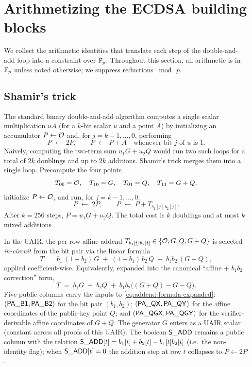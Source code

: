 \section{Arithmetizing the ECDSA building blocks}\label{sec:arith}

We collect the arithmetic identities that translate each step of the
double-and-add loop into a constraint over $\mathbb{F}_p$. Throughout this
section, all arithmetic is in $\mathbb{F}_p$ unless noted otherwise; we
suppress reductions $\bmod\,p$.

\subsection{Shamir's trick}\label{sec:shamir}

The standard binary double-and-add algorithm computes a single
scalar multiplication $u A$ (for a $k$-bit scalar $u$ and a point $A$)
by initializing an accumulator $P \leftarrow \mathcal{O}$ and, for
$j = k-1, \dots, 0$, performing
$$
P \;\leftarrow\; 2P, \qquad
P \;\leftarrow\; P + A \quad \text{whenever bit $j$ of $u$ is $1$.}
$$
Naively, computing the two-term sum $u_1 G + u_2 Q$ would run two
such loops for a total of $2k$ doublings and up to $2k$ additions.
Shamir's trick merges them into a single loop. Precompute the four
points
$$
T_{00} = \mathcal{O},\quad T_{10} = G,\quad T_{01} = Q,\quad T_{11} = G + Q,
$$
initialize $P \leftarrow \mathcal{O}$, and run, for $j = k-1, \dots, 0$,
$$
P \;\leftarrow\; 2P, \qquad
P \;\leftarrow\; P + T_{b_1[j]\,b_2[j]}.
$$
After $k = 256$ steps, $P = u_1 G + u_2 Q$. The total cost is $k$
doublings and at most $k$ mixed additions.

In the UAIR, the per-row affine addend
$T_{b_1[t]\,b_2[t]} \in \{\mathcal{O}, G, Q, G+Q\}$ is selected
\emph{in-circuit} from the bit pair via the linear formula
\begin{equation}\label{eq:addend-formula}
  T \;=\; b_1\,(1 - b_2)\,G \;+\; (1 - b_1)\,b_2\,Q \;+\; b_1 b_2\,(G + Q),
\end{equation}
applied coefficient-wise. Equivalently, expanded into the canonical
``affine + $b_1 b_2$ correction'' form,
\begin{equation}\label{eq:addend-formula-expanded}
  T \;=\; b_1 G \;+\; b_2 Q \;+\; b_1 b_2 \bigl((G+Q) - G - Q\bigr).
\end{equation}
Five public columns carry the inputs to \eqref{eq:addend-formula-expanded}:
$(\mathsf{PA\_B1}, \mathsf{PA\_B2})$ for the bit pair $(b_1, b_2)$;
$(\mathsf{PA\_QX}, \mathsf{PA\_QY})$ for the affine coordinates of the
public-key point $Q$; and $(\mathsf{PA\_QGX}, \mathsf{PA\_QGY})$ for the
verifier-derivable affine coordinates of $G + Q$. The generator $G$
enters as a UAIR scalar (constant across all proofs of this UAIR).
The boolean $\mathsf{S\_ADD}$ remains a public column with the relation
$\mathsf{S\_ADD}[t] = b_1[t] + b_2[t] - b_1[t] b_2[t]$ (i.e.\ the
non-identity flag); when $\mathsf{S\_ADD}[t] = 0$ the addition step at
row $t$ collapses to $P \leftarrow 2P$.

